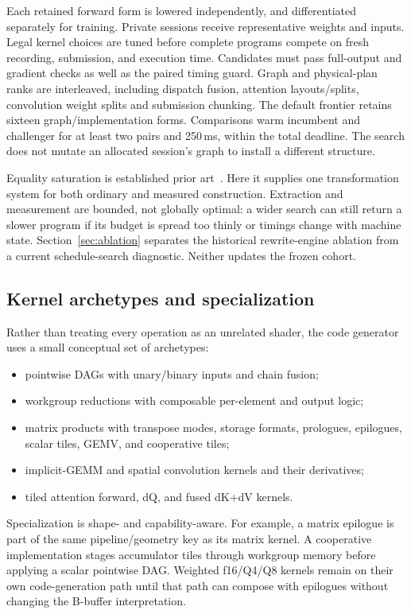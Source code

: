 \documentclass[10pt,twocolumn]{article}
\begin{document}
Each retained forward form is lowered independently, and differentiated
separately for training. Private sessions receive representative weights
and inputs. Legal kernel choices are tuned before complete programs compete
on fresh recording, submission, and execution time. Candidates must pass
full-output and gradient checks as well as the paired timing guard.
Graph and physical-plan ranks are interleaved, including dispatch fusion,
attention layouts/splits, convolution weight splits and submission chunking.
The default frontier retains sixteen graph/implementation forms. Comparisons
warm incumbent and challenger for at least two pairs and 250\,ms, within the
total deadline. The search does not mutate an allocated session's graph to
install a different structure.

Equality saturation is established prior art~\cite{willsey2021egg,
yang2021tensat}. Here it supplies one transformation system for both ordinary
and measured construction. Extraction and measurement are bounded, not
globally optimal: a wider search can still return a slower program if its
budget is spread too thinly or timings change with machine state.
Section~\ref{sec:ablation} separates the historical rewrite-engine ablation
from a current schedule-search diagnostic. Neither updates the frozen cohort.

\subsection{Kernel archetypes and specialization}

Rather than treating every operation as an unrelated shader, the code
generator uses a small conceptual set of archetypes:
\begin{itemize}
  \item pointwise DAGs with unary/binary inputs and chain fusion;
  \item workgroup reductions with composable per-element and output logic;
  \item matrix products with transpose modes, storage formats, prologues,
        epilogues, scalar tiles, GEMV, and cooperative tiles;
  \item implicit-GEMM and spatial convolution kernels and their derivatives;
  \item tiled attention forward, dQ, and fused dK+dV kernels.
\end{itemize}

Specialization is shape- and capability-aware. For example, a matrix
epilogue is part of the same pipeline/geometry key as its matrix kernel. A
cooperative implementation stages accumulator tiles through workgroup memory
before applying a scalar pointwise DAG. Weighted f16/Q4/Q8 kernels remain on
their own code-generation path until that path can compose with epilogues
without changing the B-buffer interpretation.
\end{document}
